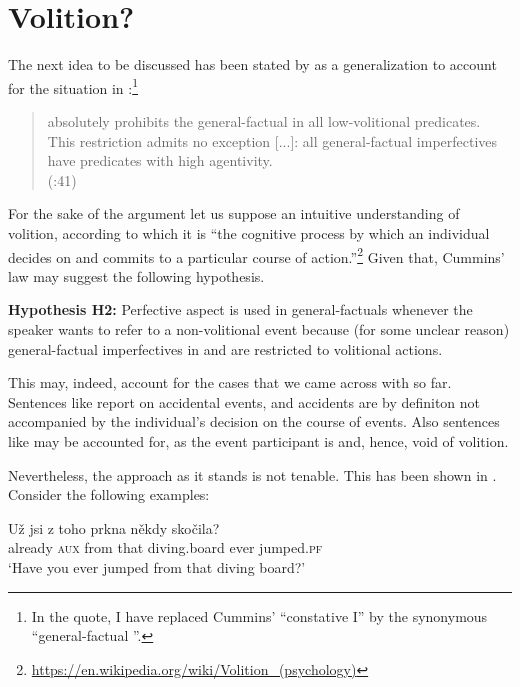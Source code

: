 \documentclass[output=paper,modfonts,newtxmath,hidelinks]{langscibook}
\begin{document}
\section{Volition?}\label{13:s4} 
The next idea to be discussed has been stated by \citet{Cummins1987} as a generalization to account for the situation in 
:\footnote{In the quote, I have replaced Cummins' ``constative I'' by the synonymous ``general-factual ''.}
\begin{quote}
  absolutely prohibits the general-factual  in all low-voli\-tional predicates. This restriction admits no exception [...]:
 all  general-factual imperfectives have predicates with high agentivity.\\\mbox{}\hfill(\citealt{Cummins1987}:41) 
\end{quote}
For the sake of the argument let us suppose an intuitive understanding of volition, according to which it is ``the cognitive process 
by which an individual decides on and commits to a particular course of action.''\footnote{\url{https://en.wikipedia.org/wiki/Volition_(psychology)}} Given that, Cummins' law may suggest the following 
hypothesis.

\begin{exe}
\ex\label{13:hypo2}
\textbf{Hypothesis H2:} Perfective aspect is used in general-factuals whenever the speaker wants to refer to a non-volitional event because (for some unclear reason) general-factual imperfectives in  and  are restricted to volitional actions. 
\end{exe}

\noindent This may, indeed, account for the cases that we came across with so far. 
Sentences like  report on accidental events, and accidents are by definiton not accompanied by the individual's decision 
on the course of events. Also sentences like  may be accounted for, as the event participant is  and, hence,
void of volition.

Nevertheless, the approach as it stands is not tenable. This has been shown in \citet[101--102]{Dickey2000}. Consider the following examples:  

\begin{exe}
\ex\label{13:prkna}
\gll U\v{z} jsi z toho prkna n\v{e}kdy sko\v{c}ila? \\
already \textsc{aux} from that diving.board ever jumped.\textsc{pf} \\
\glt `Have you ever jumped from that diving board?'
\end{exe}
\end{document}
